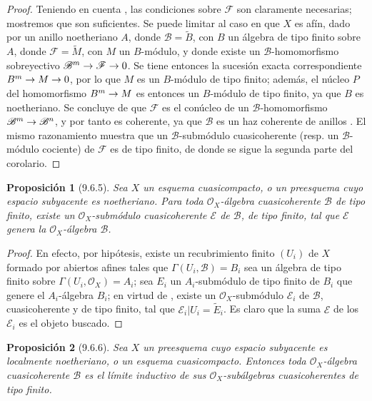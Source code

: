 \documentclass[oneside]{amsart}
\theoremstyle{ega-env-style}
\theoremstyle{ega-thm-env-style}
\newtheorem*{proposition}{Proposición}
\theoremstyle{ega-defn-env-style}
\renewcommand{\to}{\mathchoice{\longrightarrow}{\rightarrow}{\rightarrow}{\rightarrow}}
\let\EGAOriginalLabel\label
\renewcommand{\label}[1]{\phantomsection\EGAOriginalLabel{#1}}
\begin{document}
\begin{proof}
Teniendo en cuenta , las condiciones sobre $\mathscr{F}$ son claramente necesarias; mostremos que son suficientes.
Se puede limitar al caso en que $X$ es afín, dado por un anillo noetheriano $A$, donde $\mathscr{B}=\widetilde{B}$, con $B$ un álgebra de tipo finito sobre $A$, donde $\mathscr{F}=\widetilde{M}$, con $M$ un $B$-módulo, y donde existe un $\mathscr{B}$-homomorfismo sobreyectivo $\mathscr{B}^m\to\mathscr{F}\to 0$.
Se tiene entonces la sucesión exacta correspondiente $B^m\to M\to 0$, por lo que $M$ es un $B$-módulo de tipo finito; además, el núcleo $P$ del homomorfismo $B^m\to M$ es entonces un $B$-módulo de tipo finito, ya que $B$ es noetheriano.
Se concluye de  que $\mathscr{F}$ es el conúcleo de un $\mathscr{B}$-homomorfismo $\mathscr{B}^m\to\mathscr{B}^n$, y por tanto es coherente, ya que $\mathscr{B}$ es un haz coherente de anillos .
El mismo razonamiento muestra que un $\mathscr{B}$-submódulo cuasicoherente (resp. un $\mathscr{B}$-módulo cociente) de $\mathscr{F}$ es de tipo finito, de donde se sigue la segunda parte del corolario.
\end{proof}

\begin{proposition}[9.6.5]
\label{I.9.6.5}
Sea $X$ un esquema cuasicompacto, o un preesquema cuyo espacio subyacente es noetheriano.
Para toda $\mathscr{O}_X$-álgebra cuasicoherente $\mathscr{B}$ de tipo finito, existe un $\mathscr{O}_X$-submódulo cuasicoherente $\mathscr{E}$ de $\mathscr{B}$, de tipo finito, tal que $\mathscr{E}$ genera  la $\mathscr{O}_X$-álgebra $\mathscr{B}$.
\end{proposition}

\begin{proof}
En efecto, por hipótesis, existe un recubrimiento finito $(U_i)$ de $X$ formado por abiertos afines tales que $\Gamma(U_i,\mathscr{B})=B_i$ sea un álgebra de tipo finito sobre $\Gamma(U_i,\mathscr{O}_X)=A_i$; sea $E_i$ un $A_i$-submódulo de tipo finito de $B_i$ que genere el $A_i$-álgebra $B_i$; en virtud de , existe un $\mathscr{O}_X$-submódulo $\mathscr{E}_i$ de $\mathscr{B}$, cuasicoherente y de tipo finito, tal que $\mathscr{E}_i|U_i=\widetilde{E}_i$.
Es claro que la suma $\mathscr{E}$ de los $\mathscr{E}_i$ es el objeto buscado.
\end{proof}

\begin{proposition}[9.6.6]
\label{I.9.6.6}
Sea $X$ un preesquema cuyo espacio subyacente es localmente noetheriano, o un esquema cuasicompacto.
Entonces toda $\mathscr{O}_X$-álgebra cuasicoherente $\mathscr{B}$ es el límite inductivo de sus $\mathscr{O}_X$-subálgebras cuasicoherentes de tipo finito.
\end{proposition}
\end{document}
